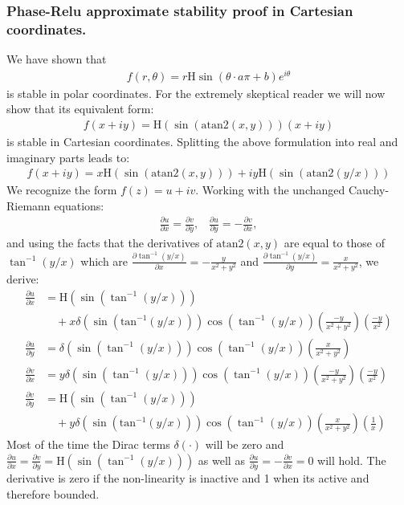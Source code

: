 \documentclass{article}
\begin{document}
\subsubsection{Phase-Relu approximate stability proof in Cartesian coordinates.}
\label{sec:CarthesianPhaseRelu}
We have shown that 
\begin{align}
f(r,\theta) = r\text{H}\sin(\theta \cdot a \pi + b)e^{i\theta}
\end{align}
is stable in polar coordinates. For the extremely skeptical reader we will now show that its equivalent form:
\begin{align}
f(x + iy) = \text{H}(\sin(\text{atan2}(x,y)))(x + iy)
\end{align}
is stable in Cartesian coordinates.
Splitting the above formulation into real and imaginary parts leads to:
\begin{align}
f(x + iy) = x\text{H}(\sin(\text{atan2}(x,y))) + i y\text{H}(\sin(\text{atan2}(y/x)))
\end{align} 
We recognize the form $f(z) = u + iv$. Working with the unchanged Cauchy-Riemann equations:
\begin{align}
\frac{\partial u}{\partial x} = \frac{\partial v}{\partial y}, \;\;\; \frac{\partial u}{\partial y} = - \frac{\partial v}{\partial x},
\end{align}
and using the facts that the derivatives of $\text{atan2}(x,y)$ are equal to those of $\tan^{-1}(y/x)$ which are $\frac{\partial \tan^{-1}(y/x)}{\partial x} = -\frac{y}{x^2 + y^2}$ and $\frac{\partial \tan^{-1}(y/x)}{\partial y} = \frac{x}{x^2 + y^2}$, we derive:
\begin{align}
\frac{\partial u}{\partial x} &= \text{H}(\sin(\tan^{-1}(y/x))) \nonumber \\
&\quad +x\delta(\sin(\text{tan}^{-1}(y/x)))\cos(\tan^{-1}(y/x))(\frac{-y}{x^2 + y^2})(\frac{-y}{x^2}) \\
\frac{\partial u}{\partial y} &= \delta(\sin(\tan^{-1}( y/x)))\cos(\tan^{-1}(y/x))(\frac{x}{x^2 + y^2}) \\
\frac{\partial v}{\partial x} &= y\delta(\sin(\tan^{-1}( y/x)))\cos(\tan^{-1}(y/x))(\frac{-y}{x^2 + y^2})(\frac{-y}{x^2}) \\
\frac{\partial v}{\partial y} &= \text{H}(\sin(\tan^{-1}(y/x))) \nonumber \\
&\quad + y\delta(\sin(\text{tan}^{-1}(y/x)))\cos(\tan^{-1}(y/x))(\frac{x}{x^2 + y^2})(\frac{1}{x})
\end{align}
Most of the time the Dirac terms $\delta(\cdot)$ will be zero and $\frac{\partial u}{\partial x} = \frac{\partial v}{\partial y} = \text{H}(\sin(\tan^{-1}(y/x)))$ as well as $\frac{\partial u}{\partial y} = - \frac{\partial v}{\partial x} = 0$ will hold. The derivative is zero if the non-linearity is inactive and 1 when its active and therefore bounded.
\end{document}
